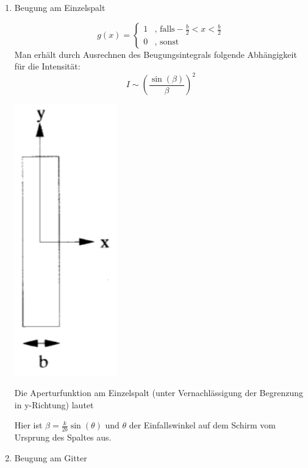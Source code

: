 \begin{enumerate}
 
\item Beugung am Einzelspalt


\begin{minipage}{0.6\textwidth}
$$ g(x) = \begin{cases} 
	1 & \text{, falls} -\frac{b}{2}<x<\frac{b}{2}\\
	0 & \text{, sonst}
     \end{cases}$$
Man erh\"alt durch Ausrechnen des Beugungsintegrals folgende Abh\"angigkeit f\"ur die Intensit\"at:
$$ I \sim \left(\frac{\sin(\beta)}{\beta}\right)^2 $$
\end{minipage}
\begin{minipage}{0.4\textwidth}
	\begin{center}
		\includegraphics[width=0.35\textwidth]{Bilder/Einzelspalt.jpg}
	\end{center}
\end{minipage}
Die Aperturfunktion am Einzelspalt (unter Vernachl\"assigung der Begrenzung in y-Richtung) lautet


Hier ist $\beta = \frac{k}{2b}\sin(\theta)$ und $\theta$ der Einfallswinkel auf dem Schirm vom Ursprung des Spaltes aus.


\item Beugung am Gitter



\end{enumerate}















